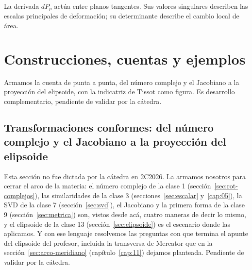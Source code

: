 La derivada \(dP_p\) actúa entre planos tangentes. Sus valores singulares describen las
escalas principales de deformación; su determinante describe el cambio local de área.

\section{Construcciones, cuentas y ejemplos}

Armamos la cuenta de punta a punta, del número complejo y el Jacobiano a la proyección del elipsoide, con la indicatriz de Tissot como figura. Es desarrollo complementario, pendiente de validar por la cátedra.

\subsection{Transformaciones conformes: del número complejo y el Jacobiano a la proyección del elipsoide}\label{sec:transformaciones-conformes}

{\small\vspace{1mm}\par}
{\small{}\par}


\begin{atencion}
Esta sección no fue dictada por la cátedra en 2C2026. La armamos nosotros para cerrar el
arco de la materia: el número complejo de la clase 1 (sección~\ref{sec:rot-complejos}),
las similaridades de la clase 3 (secciones~\ref{sec:escalar} y~\ref{cap:05}), la SVD de la
clase 7 (sección~\ref{sec:svd}), el Jacobiano y la primera forma de la clase 9
(sección~\ref{sec:metrica}) son, vistos desde acá, cuatro maneras de decir lo mismo, y
el elipsoide de la clase 13 (sección~\ref{sec:elipsoide}) es el escenario donde las
aplicamos. Y
con ese lenguaje resolvemos las preguntas con que termina el apunte del elipsoide del
profesor, incluida la transversa de Mercator que en la sección~\ref{sec:arco-meridiano}
(capítulo~\ref{cap:11}) dejamos planteada. Pendiente de validar por la cátedra.
\end{atencion}

